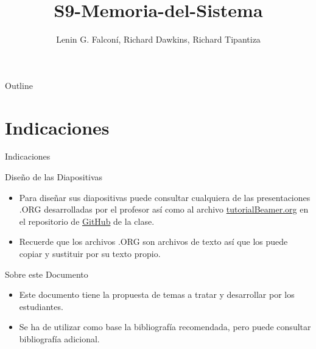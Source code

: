 \documentclass[presentation]{beamer}
\author{Lenin G. Falconí, Richard Dawkins, Richard Tipantiza}
\date{}
\title{S9-Memoria-del-Sistema}
\begin{document}
\maketitle
\begin{frame}{Outline}
\tableofcontents
\end{frame}



\section{Indicaciones}
\label{sec:orgc69a0f2}
\begin{frame}[allowframebreaks]{Indicaciones}
\end{frame}
\begin{frame}[label={sec:orgcd70fcc}]{Diseño de las Diapositivas}
\begin{itemize}
\item Para diseñar sus diapositivas puede consultar cualquiera de las
presentaciones .ORG desarrolladas por el profesor así como al
archivo \href{https://github.com/LeninGF/EPN-Lectures/blob/main/iccd332ArqComp-2024-B/Tutoriales/Beamer-Emacs/tutorialBeamer.org}{tutorialBeamer.org} en el repositorio de \href{https://github.com/LeninGF/EPN-Lectures/blob/main/iccd332ArqComp-2024-B/Tutoriales/Beamer-Emacs/tutorialBeamer.org}{GitHub} de la clase.
\item Recuerde que los archivos .ORG son archivos de texto así que los
puede copiar y sustituir por su texto propio.
\end{itemize}
\end{frame}
\begin{frame}[label={sec:org00a1a00}]{Sobre este Documento}
\begin{itemize}
\item Este documento tiene la propuesta de temas a tratar y desarrollar
por los estudiantes.
\item Se ha de utilizar como base la bibliografía recomendada, pero puede
consultar bibliografía adicional.
\end{itemize}
\end{frame}
\end{document}
